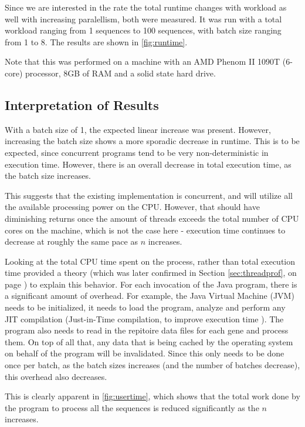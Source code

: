 \documentclass[a4paper,12pt]{report}
\begin{document}
Since we are interested in the rate the total runtime changes with workload as well with increasing paralellism, both were measured. It was run with a total workload ranging from 1 sequences to 100 sequences, with batch size ranging from 1 to 8. The results are shown in \autoref{fig:runtime}.

Note that this was performed on a machine with an AMD Phenom II 1090T (6-core) processor, 8GB of RAM and a solid state hard drive.

\subsection{Interpretation of Results}
With a batch size of 1, the expected linear increase was present. However, increasing the batch size shows a more sporadic decrease in runtime. This is to be expected, since concurrent programs tend to be very non-deterministic in execution time. However, there is an overall decrease in total execution time, as the batch size increases.

This suggests that the existing implementation is concurrent, and will utilize all the available processing power on the CPU. However, that should have diminishing returns once the amount of threads exceeds the total number of CPU cores on the machine, which is not the case here - execution time continues to decrease at roughly the same pace as $n$ increases.

Looking at the total CPU time spent on the process, rather than total execution time provided a theory (which was later confirmed in Section \ref{sec:threadprof}, on page \pageref{sec:threadprof}) to explain this behavior.
For each invocation of the Java program, there is a significant amount of overhead. For example, the Java Virtual Machine (JVM) needs to be initialized, it needs to load the program, analyze and perform any JIT compilation (Just-in-Time compilation, to improve execution time \autocite{jit}). The program also needs to read in the repitoire data files for each gene and process them. On top of all that, any data that is being cached by the operating system on behalf of the program will be invalidated. Since this only needs to be done once per batch, as the batch sizes increases (and the number of batches decrease), this overhead also decreases.

This is clearly apparent in \autoref{fig:usertime}, which shows that the total work done by the program to process all the sequences is reduced significantly as the $n$ increases.
\end{document}
